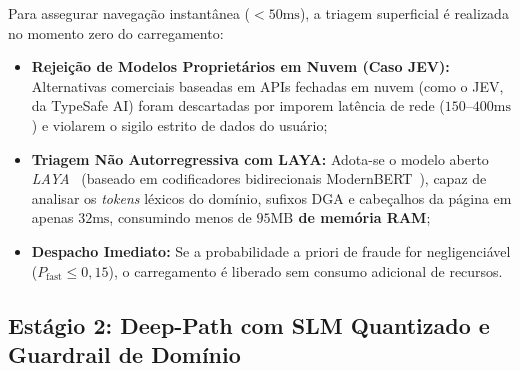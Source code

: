 Para assegurar navega\c{c}\~{a}o instant\^{a}nea ($< 50\text{ms}$), a triagem superficial \'{e} realizada no momento zero do carregamento:
\begin{itemize}
    \item \textbf{Rejei\c{c}\~{a}o de Modelos Propriet\'{a}rios em Nuvem (Caso JEV):} Alternativas comerciais baseadas em APIs fechadas em nuvem (como o JEV, da TypeSafe AI) foram descartadas por imporem lat\^{e}ncia de rede ($150\text{--}400\text{ms}$) e violarem o sigilo estrito de dados do usu\'{a}rio;
    \item \textbf{Triagem Não Autorregressiva com LAYA:} Adota-se o modelo aberto \textit{LAYA}~\cite{convai2026laya} (baseado em codificadores bidirecionais ModernBERT~\cite{warner2024modernbert}), capaz de analisar os \textit{tokens} l\'{e}xicos do dom\'{i}nio, sufixos DGA e cabe\c{c}alhos da p\'{a}gina em apenas \textbf{$32\text{ms}$}, consumindo menos de \textbf{$95\text{MB}$ de mem\'{o}ria RAM};
    \item \textbf{Despacho Imediato:} Se a probabilidade a priori de fraude for negligenci\'{a}vel ($P_{\text{fast}} \le 0{,}15$), o carregamento \'{e} liberado sem consumo adicional de recursos.
\end{itemize}

\subsection{Est\'{a}gio 2: Deep-Path com SLM Quantizado e Guardrail de Dom\'{i}nio}

